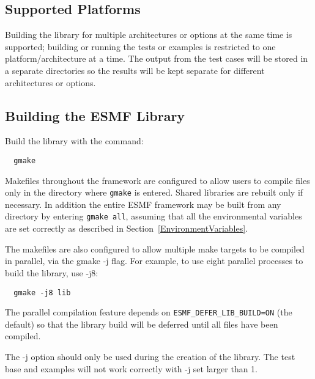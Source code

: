 \subsection{Supported Platforms}


Building the library for multiple architectures or options at the same
time is supported; building or running the tests or examples is restricted
to one platform/architecture at a time.  The output from the test cases
will be stored in a separate directories so the results will be kept 
separate for different architectures or options.

\subsection{Building the ESMF Library}
\label{BuildESMF}



Build the library with the command:
\begin{verbatim}
  gmake 
\end{verbatim}


Makefiles throughout the framework are configured to allow users to
compile files only in the directory where {\tt gmake} is entered. Shared
libraries are rebuilt only if necessary. In addition the entire ESMF
framework may be built from any directory by entering {\tt gmake all},
assuming that all the environmental variables are set correctly as
described in Section~\ref{EnvironmentVariables}.

The makefiles are also configured to allow multiple make targets to be
compiled in parallel, via the gmake -j flag.  For example, to use eight
parallel processes to build the library, use -j8:
\begin{verbatim}
  gmake -j8 lib
\end{verbatim}

The parallel compilation feature depends on {\tt ESMF\_DEFER\_LIB\_BUILD=ON}
(the default) so that the library build will be deferred until all files
have been compiled.

The -j option should only be used during the creation of the library.
The test base and examples will not work correctly with -j set larger
than 1.

